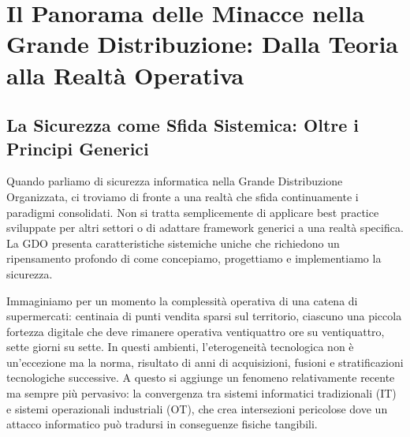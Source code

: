 

% 

% 

\chapter{Il Panorama delle Minacce nella Grande Distribuzione: Dalla Teoria alla Realtà Operativa}
\label{cap2_threat_landscape}

\section{La Sicurezza come Sfida Sistemica: Oltre i Principi Generici}

Quando parliamo di sicurezza informatica nella Grande Distribuzione Organizzata, ci troviamo di fronte a una realtà che sfida continuamente i paradigmi consolidati. Non si tratta semplicemente di applicare best practice sviluppate per altri settori o di adattare framework generici a una realtà specifica. La GDO presenta caratteristiche sistemiche uniche che richiedono un ripensamento profondo di come concepiamo, progettiamo e implementiamo la sicurezza.

Immaginiamo per un momento la complessità operativa di una catena di supermercati: centinaia di punti vendita sparsi sul territorio, ciascuno una piccola fortezza digitale che deve rimanere operativa ventiquattro ore su ventiquattro, sette giorni su sette. In questi ambienti, l'eterogeneità tecnologica non è un'eccezione ma la norma, risultato di anni di acquisizioni, fusioni e stratificazioni tecnologiche successive. A questo si aggiunge un fenomeno relativamente recente ma sempre più pervasivo: la convergenza tra sistemi informatici tradizionali (IT) e sistemi operazionali industriali (OT), che crea intersezioni pericolose dove un attacco informatico può tradursi in conseguenze fisiche tangibili.


